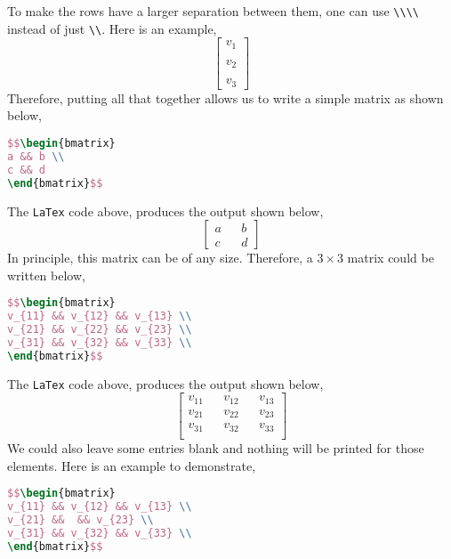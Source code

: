 \documentclass[a4paper, 12pt]{report}
\begin{document}
\begin{center}
To make the rows have a larger separation between them, one can use \texttt{\textbackslash \textbackslash \texttildelow \textbackslash \textbackslash} instead of just \texttt{\textbackslash \textbackslash}. Here is an example,
$$\begin{bmatrix}
v_{1} \\~\\ v_{2} \\~\\ v_{3}
\end{bmatrix}$$
Therefore, putting all that together allows us to write a simple matrix as shown below,
\begin{lstlisting}[language=tex]
$$\begin{bmatrix}
a && b \\
c && d
\end{bmatrix}$$
\end{lstlisting}
The \texttt{LaTex} code above, produces the output shown below,
$$\begin{bmatrix}
a && b \\
c && d
\end{bmatrix}$$
In principle, this matrix can be of any size. Therefore, a $3\times 3$ matrix could be written below,
\begin{lstlisting}[language=tex]
$$\begin{bmatrix}
v_{11} && v_{12} && v_{13} \\ 
v_{21} && v_{22} && v_{23} \\ 
v_{31} && v_{32} && v_{33} \\ 
\end{bmatrix}$$
\end{lstlisting}
The \texttt{LaTex} code above, produces the output shown below,
$$\begin{bmatrix}
v_{11} && v_{12} && v_{13} \\ 
v_{21} && v_{22} && v_{23} \\ 
v_{31} && v_{32} && v_{33} \\ 
\end{bmatrix}$$
We could also leave some entries blank and nothing will be printed for those elements. Here is an example to demonstrate,
\begin{lstlisting}[language=tex]
$$\begin{bmatrix}
v_{11} && v_{12} && v_{13} \\ 
v_{21} &&  && v_{23} \\ 
v_{31} && v_{32} && v_{33} \\ 
\end{bmatrix}$$

\end{lstlisting}
\end{center}
\end{document}
